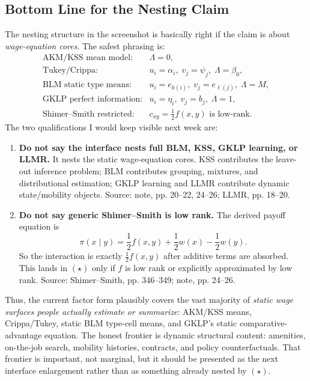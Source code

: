 \documentclass[11pt]{article}
\begin{document}
\subsection{Bottom Line for the Nesting Claim}

The nesting structure in the screenshot is basically right if the claim is about
\emph{wage-equation cores}. The safest phrasing is:
\[
\begin{array}{ll}
\text{AKM/KSS mean model:} & \Lambda=0,\\[0.25em]
\text{Tukey/Crippa:} & u_i=\alpha_i,\; v_j=\psi_j,\; \Lambda=\beta_0,\\[0.25em]
\text{BLM static type means:} & u_i=e_{k(i)},\; v_j=e_{\ell(j)},\; \Lambda=M,\\[0.25em]
\text{GKLP perfect information:} & u_i=\eta_i,\; v_j=b_j,\; \Lambda=1,\\[0.25em]
\text{Shimer--Smith restricted:} & c_{xy}=\frac{1}{2}f(x,y) \text{ is low-rank.}
\end{array}
\]
The two qualifications I would keep visible next week are:

\begin{enumerate}
\item \textbf{Do not say the interface nests full BLM, KSS, GKLP learning, or LLMR.}
It nests the static wage-equation cores. KSS contributes the leave-out inference problem;
BLM contributes grouping, mixtures, and distributional estimation; GKLP learning and
LLMR contribute dynamic state/mobility objects. Source: note, pp. 20--22, 24--26;
LLMR, pp. 18--20.

\item \textbf{Do not say generic Shimer--Smith is low rank.} The derived payoff equation is
\[
\pi(x\mid y)=\frac12 f(x,y)+\frac12 w(x)-\frac12 w(y).
\]
So the interaction is exactly $\frac12 f(x,y)$ after additive terms are absorbed.
This lands in $(\star)$ only if $f$ is low rank or explicitly approximated by low rank.
Source: Shimer--Smith, pp. 346--349; note, pp. 24--26.
\end{enumerate}

Thus, the current factor form plausibly covers the vast majority of \emph{static wage
surfaces people actually estimate or summarize}: AKM/KSS means, Crippa/Tukey,
static BLM type-cell means, and GKLP's static comparative-advantage equation. The
honest frontier is dynamic structural content: amenities, on-the-job search, mobility
histories, contracts, and policy counterfactuals. That frontier is important, not marginal,
but it should be presented as the next interface enlargement rather than as something
already nested by $(\star)$.
\end{document}
